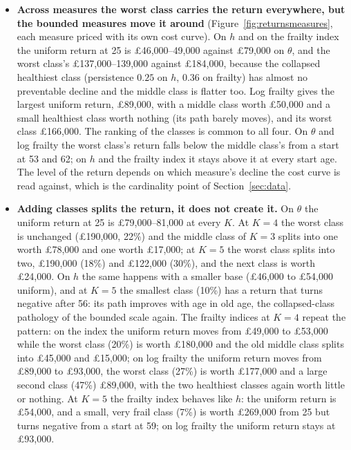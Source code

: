 \documentclass[11pt]{article}
\begin{document}
\begin{itemize}
		\item \textbf{Across measures the worst class carries the return everywhere, but the bounded measures move it around} (Figure~\ref{fig:returnsmeasures}, each measure priced with its own cost curve). On $h$ and on the frailty index the uniform return at 25 is \pounds46,000--49,000 against \pounds79,000 on $\theta$, and the worst class's \pounds137,000--139,000 against \pounds184,000, because the collapsed healthiest class (persistence $0.25$ on $h$, $0.36$ on frailty) has almost no preventable decline and the middle class is flatter too. Log frailty gives the largest uniform return, \pounds89,000, with a middle class worth \pounds50,000 and a small healthiest class worth nothing (its path barely moves), and its worst class \pounds166,000. The ranking of the classes is common to all four. On $\theta$ and log frailty the worst class's return falls below the middle class's from a start at 53 and 62; on $h$ and the frailty index it stays above it at every start age. The level of the return depends on which measure's decline the cost curve is read against, which is the cardinality point of Section~\ref{sec:data}.
		\item \textbf{Adding classes splits the return, it does not create it.} On $\theta$ the uniform return at 25 is \pounds79,000--81,000 at every $K$. At $K=4$ the worst class is unchanged (\pounds190,000, 22\%) and the middle class of $K=3$ splits into one worth \pounds78,000 and one worth \pounds17,000; at $K=5$ the worst class splits into two, \pounds190,000 (18\%) and \pounds122,000 (30\%), and the next class is worth \pounds24,000. On $h$ the same happens with a smaller base (\pounds46,000 to \pounds54,000 uniform), and at $K=5$ the smallest class (10\%) has a return that turns negative after 56: its path improves with age in old age, the collapsed-class pathology of the bounded scale again. The frailty indices at $K=4$ repeat the pattern: on the index the uniform return moves from \pounds49,000 to \pounds53,000 while the worst class (20\%) is worth \pounds180,000 and the old middle class splits into \pounds45,000 and \pounds15,000; on log frailty the uniform return moves from \pounds89,000 to \pounds93,000, the worst class (27\%) is worth \pounds177,000 and a large second class (47\%) \pounds89,000, with the two healthiest classes again worth little or nothing. At $K=5$ the frailty index behaves like $h$: the uniform return is \pounds54,000, and a small, very frail class (7\%) is worth \pounds269,000 from 25 but turns negative from a start at 59; on log frailty the uniform return stays at \pounds93,000.
	\end{itemize}
\end{document}
